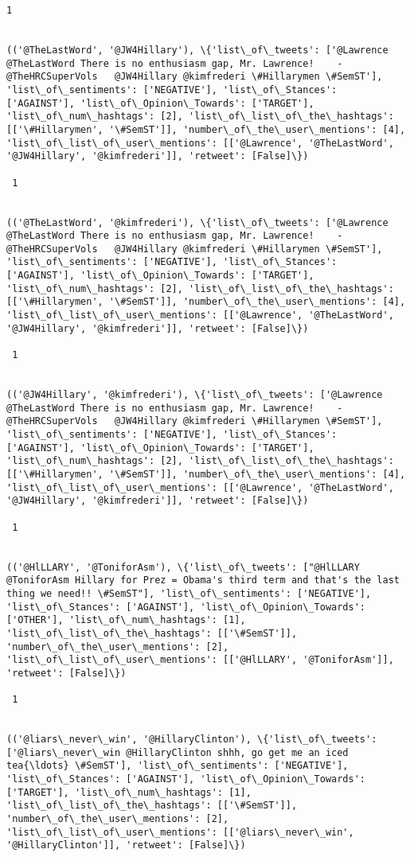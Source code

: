 \documentclass[11pt]{article}
\begin{document}
\begin{Verbatim}[commandchars=\\\{\}]
 1
 

(('@TheLastWord', '@JW4Hillary'), \{'list\_of\_tweets': ['@Lawrence @TheLastWord There is no enthusiasm gap, Mr. Lawrence!    -@TheHRCSuperVols   @JW4Hillary @kimfrederi \#Hillarymen \#SemST'], 'list\_of\_sentiments': ['NEGATIVE'], 'list\_of\_Stances': ['AGAINST'], 'list\_of\_Opinion\_Towards': ['TARGET'], 'list\_of\_num\_hashtags': [2], 'list\_of\_list\_of\_the\_hashtags': [['\#Hillarymen', '\#SemST']], 'number\_of\_the\_user\_mentions': [4], 'list\_of\_list\_of\_user\_mentions': [['@Lawrence', '@TheLastWord', '@JW4Hillary', '@kimfrederi']], 'retweet': [False]\})

 1
 

(('@TheLastWord', '@kimfrederi'), \{'list\_of\_tweets': ['@Lawrence @TheLastWord There is no enthusiasm gap, Mr. Lawrence!    -@TheHRCSuperVols   @JW4Hillary @kimfrederi \#Hillarymen \#SemST'], 'list\_of\_sentiments': ['NEGATIVE'], 'list\_of\_Stances': ['AGAINST'], 'list\_of\_Opinion\_Towards': ['TARGET'], 'list\_of\_num\_hashtags': [2], 'list\_of\_list\_of\_the\_hashtags': [['\#Hillarymen', '\#SemST']], 'number\_of\_the\_user\_mentions': [4], 'list\_of\_list\_of\_user\_mentions': [['@Lawrence', '@TheLastWord', '@JW4Hillary', '@kimfrederi']], 'retweet': [False]\})

 1
 

(('@JW4Hillary', '@kimfrederi'), \{'list\_of\_tweets': ['@Lawrence @TheLastWord There is no enthusiasm gap, Mr. Lawrence!    -@TheHRCSuperVols   @JW4Hillary @kimfrederi \#Hillarymen \#SemST'], 'list\_of\_sentiments': ['NEGATIVE'], 'list\_of\_Stances': ['AGAINST'], 'list\_of\_Opinion\_Towards': ['TARGET'], 'list\_of\_num\_hashtags': [2], 'list\_of\_list\_of\_the\_hashtags': [['\#Hillarymen', '\#SemST']], 'number\_of\_the\_user\_mentions': [4], 'list\_of\_list\_of\_user\_mentions': [['@Lawrence', '@TheLastWord', '@JW4Hillary', '@kimfrederi']], 'retweet': [False]\})

 1
 

(('@HlLLARY', '@ToniforAsm'), \{'list\_of\_tweets': ["@HlLLARY @ToniforAsm Hillary for Prez = Obama's third term and that's the last thing we need!! \#SemST"], 'list\_of\_sentiments': ['NEGATIVE'], 'list\_of\_Stances': ['AGAINST'], 'list\_of\_Opinion\_Towards': ['OTHER'], 'list\_of\_num\_hashtags': [1], 'list\_of\_list\_of\_the\_hashtags': [['\#SemST']], 'number\_of\_the\_user\_mentions': [2], 'list\_of\_list\_of\_user\_mentions': [['@HlLLARY', '@ToniforAsm']], 'retweet': [False]\})

 1
 

(('@liars\_never\_win', '@HillaryClinton'), \{'list\_of\_tweets': ['@liars\_never\_win @HillaryClinton shhh, go get me an iced tea{\ldots} \#SemST'], 'list\_of\_sentiments': ['NEGATIVE'], 'list\_of\_Stances': ['AGAINST'], 'list\_of\_Opinion\_Towards': ['TARGET'], 'list\_of\_num\_hashtags': [1], 'list\_of\_list\_of\_the\_hashtags': [['\#SemST']], 'number\_of\_the\_user\_mentions': [2], 'list\_of\_list\_of\_user\_mentions': [['@liars\_never\_win', '@HillaryClinton']], 'retweet': [False]\})


\end{Verbatim}
\end{document}
